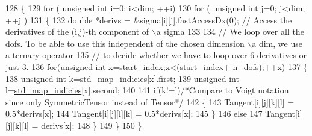 \begin{DoxyCode}
128     \{
129         \textcolor{keywordflow}{for} ( \textcolor{keywordtype}{unsigned} \textcolor{keywordtype}{int} i=0; i<dim; ++i)
130             \textcolor{keywordflow}{for} ( \textcolor{keywordtype}{unsigned} \textcolor{keywordtype}{int} j=0; j<dim; ++j )
131             \{
132                 \textcolor{keywordtype}{double} *derivs = &sigma[i][j].fastAccessDx(0); \textcolor{comment}{// Access the derivatives of the (i,j)-th
       component of \(\backslash\)a sigma}
133                 
134                 \textcolor{comment}{// We loop over all the dofs. To be able to use this independent of the chosen dimension \(\backslash\)a
       dim, we use a ternary operator}
135                 \textcolor{comment}{// to decide whether we have to loop over 6 derivatives or just 3.}
136                 \textcolor{keywordflow}{for}(\textcolor{keywordtype}{unsigned} \textcolor{keywordtype}{int} x=\hyperlink{classSacado__Wrapper_1_1SymTensor_afe921e6044e4110fcfc848c52844d650}{start\_index};x<(\hyperlink{classSacado__Wrapper_1_1SymTensor_afe921e6044e4110fcfc848c52844d650}{start\_index}+
      \hyperlink{classSacado__Wrapper_1_1SymTensor_a733bc4b029ff8d067b48e7ce3ee7606b}{n\_dofs});++x)
137                 \{
138                     \textcolor{keywordtype}{unsigned} \textcolor{keywordtype}{int} k=\hyperlink{classSacado__Wrapper_1_1SymTensor_ae3b1c56cde3fc5c7805b618ef3d9de75}{std\_map\_indicies}[x].first;
139                     \textcolor{keywordtype}{unsigned} \textcolor{keywordtype}{int} l=\hyperlink{classSacado__Wrapper_1_1SymTensor_ae3b1c56cde3fc5c7805b618ef3d9de75}{std\_map\_indicies}[x].second;
140 
141                     \textcolor{keywordflow}{if}(k!=l)\textcolor{comment}{/*Compare to Voigt notation since only SymmetricTensor instead of Tensor*/}
142                     \{
143                         Tangent[i][j][k][l] = 0.5*derivs[x];
144                         Tangent[i][j][l][k] = 0.5*derivs[x];
145                     \}
146                     \textcolor{keywordflow}{else}
147                         Tangent[i][j][k][l] = derivs[x];
148                 \}
149             \}
150     \}
\end{DoxyCode}
